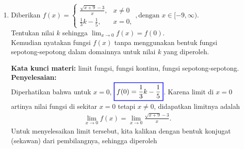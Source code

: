 \documentclass[10pt,openany,a4paper]{article}
\theoremstyle{definition}
\theoremstyle{definition}
\theoremstyle{plain}
\newenvironment{jawab}[2][tes]{%
\par\noindent\textbf{Kata kunci materi:} #1.\\
\textbf{Penyelesaian:} #2%
}{}
\begin{document}
\begin{enumerate}
\begin{jawab}[turunan fungsi, aturan rantai]
{\begin{align*}
            &= \frac{3}{2}\left(\frac{3}{x}+x^2\right)^{1/2} \left(-\frac{3}{x^2}+2x\right)\\
            &= \colorlet{oldcolor}{.}
        \color{blue}
        \setlength{\fboxrule}{1pt} \boxed{\color{oldcolor}\frac{3}{2}\left(\frac{3}{x}+x^2\right)^{1/2} \left(2x-\frac{3}{x^2}\right)}\color{oldcolor}.
        \end{align*}
        Selanjutnya, substitusi $x=2$ ke dalam $f'(x)$, diperoleh
        \begin{align*}
            f'(2) &= \frac{3}{2}\left(\frac{3}{2}+4\right)^{1/2} \left(4-\frac{3}{4}\right)\\
            &= \frac{3}{2}\left(\frac{11}{2}\right)^{1/2} \left(\frac{13}{4}\right)\\
            &= \frac{39}{8}\sqrt{\frac{11}{2}}\\
            &= \colorlet{oldcolor}{.}
        \color{red}
        \setlength{\fboxrule}{1pt} \boxed{\color{oldcolor}\frac{39}{16}\sqrt{22}}\color{oldcolor}.
        \end{align*}
    }
    \end{jawab}
    \item Diberikan $f(x)=\begin{cases}
        \frac{\sqrt{x+9}-3}{x}, &x\neq 0\\
        \frac{1}{3}k-\frac{1}{5}, &x=0,
    \end{cases}, \text{dengan } x\in [-9,\infty)$.\\
    Tentukan nilai $k$ sehingga $\displaystyle\lim_{x\to 0}f(x)=f(0)$.\\
    Kemudian nyatakan fungsi $f(x)$ tanpa menggunakan bentuk fungsi sepotong-sepotong dalam domainnya untuk nilai $k$ yang diperoleh.
    \begin{jawab}[limit fungsi, fungsi kontinu, fungsi sepotong-sepotong]{~~\\
            Diperhatikan bahwa untuk \(x = 0\), $\colorlet{oldcolor}{.}
        \color{blue}
        \setlength{\fboxrule}{1pt} \boxed{\color{oldcolor}f(0) = \frac{1}{3}k-\frac{1}{5}}\color{oldcolor}$. Karena limit di $x=0$ artinya nilai fungsi di sekitar $x=0$ tetapi $x\neq 0$, didapatkan limitnya adalah
            \begin{align*}
            \lim_{x \to 0} f(x) = \lim_{x \to 0} \frac{\sqrt{x+9}-3}{x}.
            \end{align*}
            Untuk menyelesaikan limit tersebut, kita kalikan dengan bentuk konjugat (sekawan) dari pembilangnya, sehingga diperoleh
            \begin{align*}

\end{align*}}
\end{jawab}
\end{enumerate}
\end{document}
